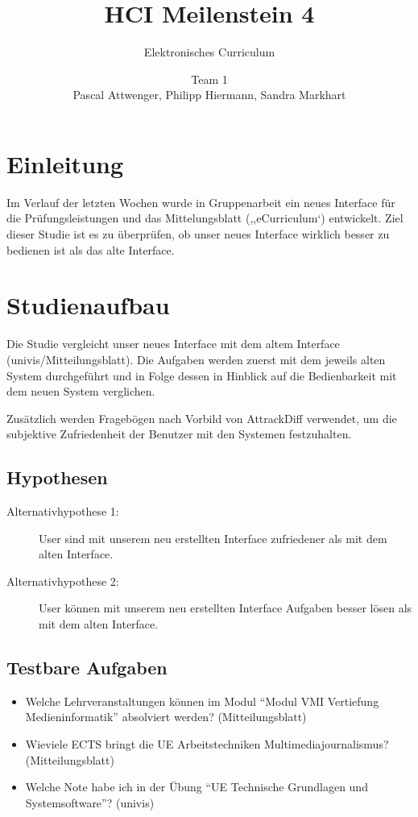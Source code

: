 \documentclass[a4paper,10pt]{scrartcl}
\title{HCI Meilenstein 4}
\subtitle{Elektronisches Curriculum}
\author{Team 1 \\Pascal Attwenger, Philipp Hiermann, Sandra Markhart}
\begin{document}
\maketitle

\section{Einleitung}

Im Verlauf der letzten Wochen wurde in Gruppenarbeit ein neues Interface für die Prüfungsleistungen und das Mittelungsblatt (,,eCurriculum`) entwickelt.
Ziel dieser Studie ist es zu überprüfen, ob unser neues Interface wirklich besser zu bedienen ist als das alte Interface.

\section{Studienaufbau} 

Die Studie vergleicht unser neues Interface mit dem altem Interface (univis/Mitteilungsblatt). Die Aufgaben werden zuerst mit dem jeweils alten System durchgeführt und in Folge dessen in Hinblick auf die Bedienbarkeit mit dem neuen System verglichen.

Zusätzlich werden Fragebögen nach Vorbild von AttrackDiff verwendet, um die subjektive Zufriedenheit der Benutzer mit den Systemen festzuhalten.

\subsection{Hypothesen}

\begin{description}
 \item[Alternativhypothese 1: ] User sind mit unserem neu erstellten Interface zufriedener als mit dem alten Interface. 
\end{description}

\begin{description}
 \item[Alternativhypothese 2: ] User können mit unserem neu erstellten Interface Aufgaben besser lösen als mit dem alten Interface. 
\end{description}

\subsection{Testbare Aufgaben}

\begin{itemize}
 \item Welche Lehrveranstaltungen können im Modul ``Modul VMI Vertiefung Medieninformatik'' absolviert werden? (Mitteilungsblatt)
 \item Wieviele ECTS bringt die UE Arbeitstechniken Multimediajournalismus? (Mitteilungsblatt)
 \item Welche Note habe ich in der Übung ``UE Technische Grundlagen und Systemsoftware''? (univis)
\end{itemize}
\end{document}
